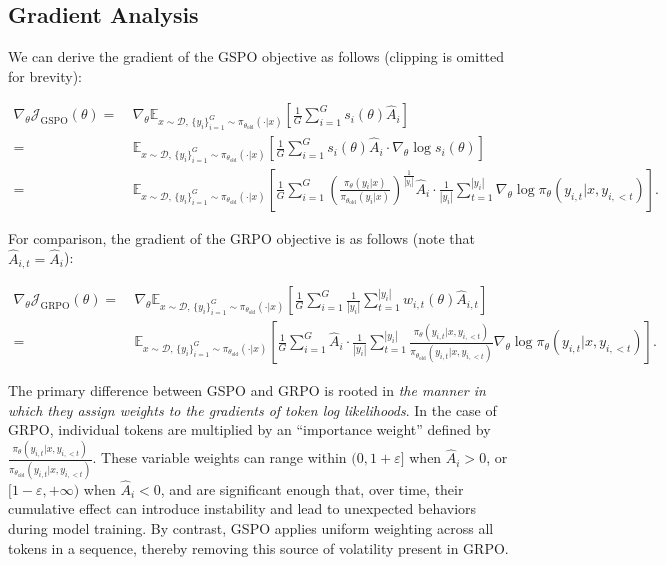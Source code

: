 \subsection{Gradient Analysis}
\label{subsec:gradient}

We can derive the gradient of the GSPO objective as follows (clipping is omitted for brevity):

\begin{align}
\nabla_{\theta} \mathcal{J}_\text{GSPO} (\theta)
=&\ 
\nabla_{\theta} \mathbb{E}_{ x \sim \mathcal{D},\, \{y_i\}_{i=1}^G \sim \pi_{\theta_\text{old}}( \cdot | x) }
\left[ 
\frac{1}{G} \sum_{i=1}^{G} s_{i}(\theta) \widehat{A}_{i}
\right] \\
= &\ 
\mathbb{E}_{ x \sim \mathcal{D},\, \{y_i\}_{i=1}^G \sim \pi_{\theta_\text{old}}( \cdot | x) }
\left[ 
\frac{1}{G} \sum_{i=1}^{G}
s_{i}(\theta) \widehat{A}_{i}
\cdot \nabla_{\theta} \log s_{i}(\theta)
\right] \\
=&\ 
\mathbb{E}_{ x \sim \mathcal{D},\, \{y_i\}_{i=1}^G \sim \pi_{\theta_\text{old}}( \cdot | x) }
\left[ 
\frac{1}{G} \sum_{i=1}^{G} 
\left( \frac{ \pi_{\theta} (y_i | x) }{ \pi_{\theta_\text{old}} (y_i | x)} \right)^{\frac{1}{|y_i|}} \widehat{A}_{i} 
\cdot \frac{1}{|y_i|} \sum_{t=1}^{|y_i|} \nabla_{\theta} \log \pi_{\theta} (y_{i,t} | x, y_{i,<t}) 
\right].
\label{equ:gspo_grad}
\end{align}

For comparison, the gradient of the GRPO objective is as follows (note that $\widehat{A}_{i,t} = \widehat{A}_{i}$):

\begin{align}
\nabla_{\theta} \mathcal{J}_\text{GRPO} (\theta) 
=&\ 
\nabla_{\theta} \mathbb{E}_{ x \sim \mathcal{D},\, \{y_i\}_{i=1}^G \sim \pi_{\theta_\text{old}}( \cdot | x) }
\left[ \frac{1}{G} \sum_{i=1}^{G} \frac{1}{|y_i|} \sum_{t=1}^{|y_i|} 
w_{i,t}(\theta) \widehat{A}_{i,t}
\right] \\
=&\
\mathbb{E}_{ x \sim \mathcal{D},\, \{y_i\}_{i=1}^G \sim \pi_{\theta_\text{old}}( \cdot | x) }
\left[ \frac{1}{G} \sum_{i=1}^{G} \widehat{A}_{i} 
\cdot \frac{1}{|y_i|} \sum_{t=1}^{|y_i|} 
\frac{ \pi_{\theta} (y_{i,t} | x, y_{i,<t}) }{ \pi_{\theta_\text{old}} (y_{i,t} | x,y_{i,<t})} 
\nabla_{\theta} \log \pi_{\theta} (y_{i,t} | x, y_{i,<t})  
\right].
\end{align}

The primary difference between GSPO and GRPO is rooted in \textit{the manner in which they assign weights to the gradients of token log likelihoods}. In the case of GRPO, individual tokens are multiplied by an ``importance weight'' defined by $\frac{ \pi_{\theta} (y_{i,t} | x, y_{i,<t}) }{ \pi_{\theta_\text{old}} (y_{i,t} | x,y_{i,<t})}$. These variable weights can range within $(0, 1+\varepsilon]$ when $\widehat{A}_{i} >0$, or $[1-\varepsilon, +\infty)$ when $\widehat{A}_{i} < 0$, and are significant enough that, over time, their cumulative effect can introduce instability and lead to unexpected behaviors during model training. By contrast, GSPO applies uniform weighting across all tokens in a sequence, thereby removing this source of volatility present in GRPO.

